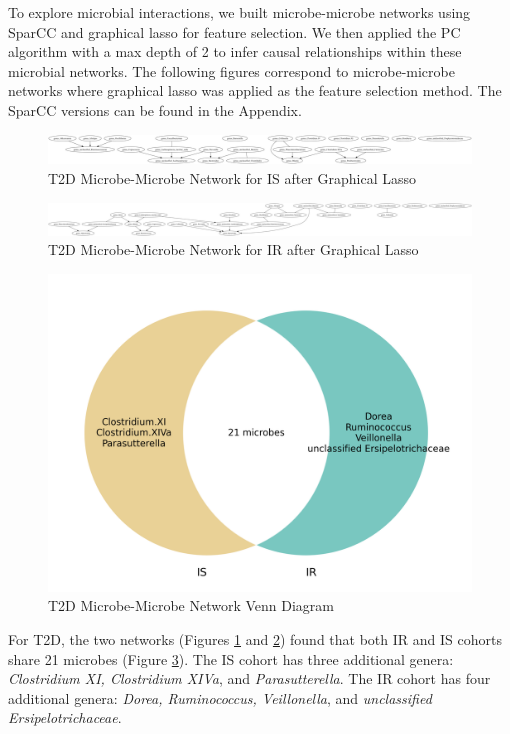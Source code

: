 \documentclass[12pt,letterpaper]{article}
\begin{document}
To explore microbial interactions, we built microbe-microbe networks using SparCC and graphical lasso for feature selection. We then applied the PC algorithm with a max depth of 2 to infer causal relationships within these microbial networks. The following figures correspond to microbe-microbe networks where graphical lasso was applied as the feature selection method. The SparCC versions can be found in the Appendix.

\begin{figure}[h!]
  \centering
  \includegraphics[width=\linewidth]{../graphs/t2d/glasso_IS_norm.png}
  \caption{T2D Microbe-Microbe Network for IS after Graphical Lasso}
  \label{fig:t2dglassoISnorm}
\end{figure}

\begin{figure}[h!]
  \centering
  \includegraphics[width=\linewidth]{../graphs/t2d/glasso_IR_norm.png}
  \caption{T2D Microbe-Microbe Network for IR after Graphical Lasso}
  \label{fig:t2dglassoIRnorm}
\end{figure}

\begin{figure}[h!]
  \centering
  \includegraphics[width=0.8\linewidth]{../poster/t2d_microbe_microbe_venn.png}
  \caption{T2D Microbe-Microbe Network Venn Diagram}
  \label{fig:t2dglassovenn}
\end{figure}

For T2D, the two networks (Figures \ref{fig:t2dglassoISnorm} and \ref{fig:t2dglassoIRnorm}) found that both IR and IS cohorts share 21 microbes (Figure \ref{fig:t2dglassovenn}). The IS cohort has three additional genera: \textit{Clostridium XI, Clostridium XIVa}, and \textit{Parasutterella}. The IR cohort has four additional genera: \textit{Dorea, Ruminococcus, Veillonella}, and \textit{unclassified Ersipelotrichaceae}.
\end{document}
